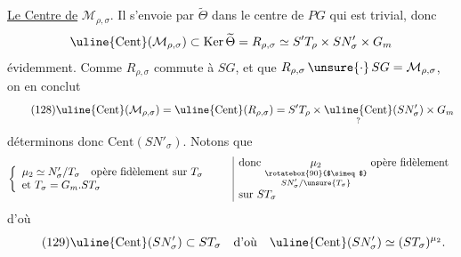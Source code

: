 
\uline{Le Centre de} $\mathcal M_{\rho,\sigma}$. Il s'envoie par $\widetilde\Theta$ dans le centre de $PG$ qui est trivial, donc
\[
\uline{\mathrm{Cent}}(\mathcal M_{\rho,\sigma})\subset\operatorname{Ker}\widetilde\Theta
=R_{\rho,\sigma}\simeq S'T_\rho\times SN'_\sigma\times G_m
\]
 évidemment. Comme $R_{\rho,\sigma}$ commute à $SG$, et que $R_{\rho,\sigma}\,\unsure{\cdot}\,SG=\mathcal M_{\rho,\sigma}$, on en conclut
\[
\tag{128}
\uline{\mathrm{Cent}}(\mathcal M_{\rho,\sigma})
=\uline{\mathrm{Cent}}(R_{\rho,\sigma})
=S'T_\rho\times\underset{?}{\uline{\mathrm{Cent}}}(SN'_\sigma)\times G_m
\]
déterminons donc $\mathrm{Cent}(SN'_\sigma)$. Notons que
\[
\left\{\begin{array}{l}
\mu_2\simeq N'_\sigma/T_\sigma\quad\text{opère fidèlement sur }T_\sigma\\
\text{et }T_\sigma=G_m.ST_\sigma
\end{array}\right.
\qquad
\begin{array}{|l}
\text{donc }\underset{\substack{\rotatebox{90}{$\simeq$}\\SN'_\sigma/\unsure{T_\sigma}}}{\mu_2}\text{ opère fidèlement}\\
\text{sur }ST_\sigma
\end{array}
\]
d'où
\[
\tag{129}
\uline{\mathrm{Cent}}(SN'_\sigma)\subset ST_\sigma
\quad\text{d'où}\quad
\uline{\mathrm{Cent}}(SN'_\sigma)\simeq(ST_\sigma)^{\mu_2}.
\]

